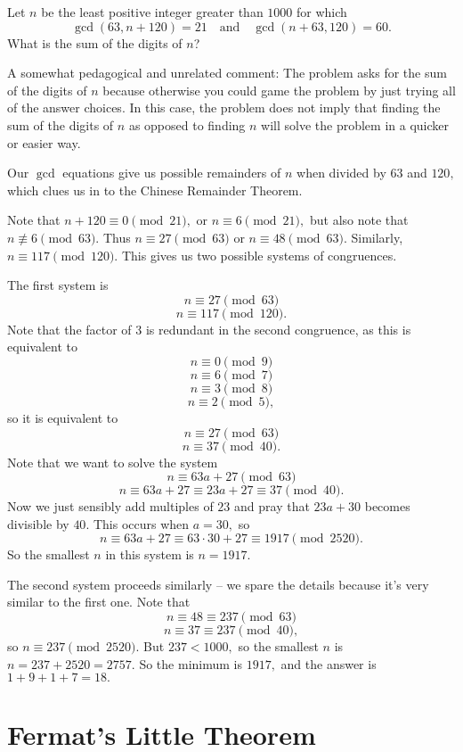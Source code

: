 \documentclass[blue,onecol]{shooting}
\begin{document}
\begin{exam}[AMC 10A 2020/24]
Let $n$ be the least positive integer greater than $1000$ for which\[\gcd(63, n+120) =21\quad \text{and} \quad \gcd(n+63, 120)=60.\]What is the sum of the digits of $n$?
\end{exam}

A somewhat pedagogical and unrelated comment: The problem asks for the sum of the digits of $n$ because otherwise you could game the problem by just trying all of the answer choices. In this case, the problem does not imply that finding the sum of the digits of $n$ as opposed to finding $n$ will solve the problem in a quicker or easier way.

\begin{sol}
Our $\gcd$ equations give us possible remainders of $n$ when divided by $63$ and $120,$ which clues us in to the Chinese Remainder Theorem.

Note that $n+120\equiv 0\pmod{21},$ or $n\equiv 6\pmod{21},$ but also note that $n\not\equiv 6\pmod{63}.$ Thus $n\equiv 27\pmod{63}$ or $n\equiv 48\pmod{63}.$ Similarly, $n\equiv 117\pmod{120}.$ This gives us two possible systems of congruences.

The first system is
\[n\equiv 27\pmod{63}\]
\[n\equiv 117\pmod{120}.\]
Note that the factor of $3$ is redundant in the second congruence, as this is equivalent to
\[n\equiv 0\pmod{9}\]
\[n\equiv 6\pmod{7}\]
\[n\equiv 3\pmod{8}\]
\[n\equiv 2\pmod{5},\]
so it is equivalent to
\[n\equiv 27\pmod{63}\]
\[n\equiv 37\pmod{40}.\]
Note that we want to solve the system
\[n\equiv 63a+27\pmod{63}\]
\[n\equiv 63a+27\equiv 23a+27\equiv 37\pmod{40}.\]
Now we just sensibly add multiples of $23$ and pray that $23a+30$ becomes divisible by $40.$ This occurs when $a=30,$ so
\[n\equiv 63a+27\equiv 63\cdot 30+27\equiv 1917\pmod{2520}.\]
So the smallest $n$ in this system is $n=1917.$

The second system proceeds similarly -- we spare the details because it's very similar to the first one. Note that
\[n\equiv 48\equiv 237\pmod{63}\]
\[n\equiv 37\equiv 237\pmod{40},\]
so $n\equiv 237\pmod{2520}.$
But $237<1000,$ so the smallest $n$ is $n=237+2520=2757.$ So the minimum is $1917,$ and the answer is $1+9+1+7=18.$
\end{sol}

\section{Fermat's Little Theorem}
\end{document}
